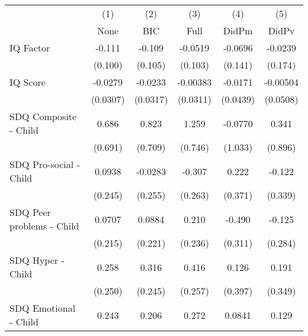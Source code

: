 {
\def\sym#1{\ifmmode^{#1}\else\(^{#1}\)\fi}
\begin{tabular}{l*{5}{c}}
\toprule
            &\multicolumn{1}{c}{(1)}&\multicolumn{1}{c}{(2)}&\multicolumn{1}{c}{(3)}&\multicolumn{1}{c}{(4)}&\multicolumn{1}{c}{(5)}\\
            &\multicolumn{1}{c}{None}&\multicolumn{1}{c}{BIC}&\multicolumn{1}{c}{Full}&\multicolumn{1}{c}{DidPm}&\multicolumn{1}{c}{DidPv}\\
\midrule
IQ Factor   &      -0.111         &      -0.109         &     -0.0519         &     -0.0696         &     -0.0239         \\
            &     (0.100)         &     (0.105)         &     (0.103)         &     (0.141)         &     (0.174)         \\
\addlinespace
IQ Score    &     -0.0279         &     -0.0233         &    -0.00383         &     -0.0171         &    -0.00504         \\
            &    (0.0307)         &    (0.0317)         &    (0.0311)         &    (0.0439)         &    (0.0508)         \\
\addlinespace
SDQ Composite - Child&       0.686         &       0.823         &       1.259         &     -0.0770         &       0.341         \\
            &     (0.691)         &     (0.709)         &     (0.746)         &     (1.033)         &     (0.896)         \\
\addlinespace
SDQ Pro-social - Child&      0.0938         &     -0.0283         &      -0.307         &       0.222         &      -0.122         \\
            &     (0.245)         &     (0.255)         &     (0.263)         &     (0.371)         &     (0.339)         \\
\addlinespace
SDQ Peer problems - Child&      0.0707         &      0.0884         &       0.210         &      -0.490         &      -0.125         \\
            &     (0.215)         &     (0.221)         &     (0.236)         &     (0.311)         &     (0.284)         \\
\addlinespace
SDQ Hyper - Child&       0.258         &       0.316         &       0.416         &       0.126         &       0.191         \\
            &     (0.250)         &     (0.245)         &     (0.257)         &     (0.397)         &     (0.349)         \\
\addlinespace
SDQ Emotional - Child&       0.243         &       0.206         &       0.272         &      0.0841         &       0.129         \\

\end{tabular}}
